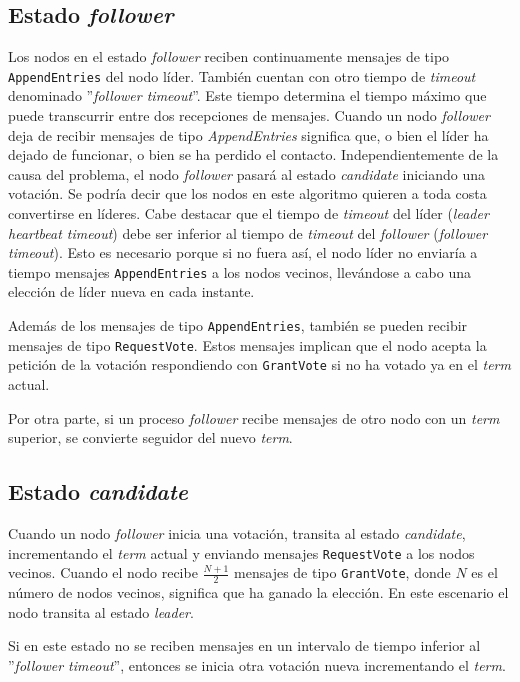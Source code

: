 \subsection*{Estado \textit{follower}}

Los nodos en el estado \textit{follower} reciben continuamente mensajes de tipo \texttt{AppendEntries} del nodo líder. También cuentan con otro tiempo de \textit{timeout} denominado ''\textit{follower timeout}''. Este tiempo determina el tiempo máximo que puede transcurrir entre dos recepciones de mensajes. Cuando un nodo \textit{follower} deja de recibir mensajes de tipo \textit{AppendEntries} significa que, o bien el líder ha dejado de funcionar, o bien se ha perdido el contacto. Independientemente de la causa del problema, el nodo \textit{follower} pasará al estado \textit{candidate} iniciando una votación. Se podría decir que los nodos en este algoritmo quieren a toda costa convertirse en líderes. Cabe destacar que el tiempo de \textit{timeout} del líder (\textit{leader heartbeat timeout}) debe ser inferior al tiempo de \textit{timeout} del \textit{follower} (\textit{follower timeout}). Esto es necesario porque si no fuera así, el nodo líder no enviaría a tiempo mensajes \texttt{AppendEntries} a los nodos vecinos, llevándose a cabo una elección de líder nueva en cada instante.

Además de los mensajes de tipo \texttt{AppendEntries}, también se pueden recibir mensajes de tipo \texttt{RequestVote}. Estos mensajes implican que el nodo acepta la petición de la votación respondiendo con \texttt{GrantVote} si no ha votado ya en el \textit{term} actual.

Por otra parte, si un proceso \textit{follower} recibe mensajes de otro nodo con un \textit{term} superior, se convierte seguidor del nuevo \textit{term}.

\subsection*{Estado \textit{candidate}}

Cuando un nodo \textit{follower} inicia una votación, transita al estado \textit{candidate}, incrementando el \textit{term} actual y enviando mensajes \texttt{RequestVote} a los nodos vecinos. Cuando el nodo recibe $\frac{N + 1}{2}$ mensajes de tipo \texttt{GrantVote}, donde $N$ es el número de nodos vecinos, significa que ha ganado la elección. En este escenario el nodo transita al estado \textit{leader}.

Si en este estado no se reciben mensajes en un intervalo de tiempo inferior al ''\textit{follower timeout}'', entonces se inicia otra votación nueva incrementando el \textit{term}.


